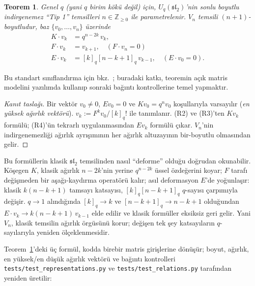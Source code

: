 \documentclass[10pt]{math}
\numberwithin{equation}{section}
\theoremstyle{plain}
\newtheorem{theorem}{Teorem}[section]
\theoremstyle{definition}
\renewcommand{\sl}{\mathfrak{sl}}
\newcommand{\Uq}{U_q(\sl_2)}
\newcommand{\Z}{\mathbb{Z}}
\newcommand{\qint}[1]{[#1]_q}
\newcommand{\qfact}[1]{[#1]_q!}
\begin{document}
\begin{theorem}\label{thm:irreps}
Genel $q$ (yani $q$ birim kökü değil) için, $\Uq$'nin sonlu boyutlu
indirgenemez ``Tip 1'' temsilleri $n \in \Z_{\geq 0}$ ile parametrelenir.
$V_n$ temsili $(n+1)$-boyutludur, baz $\{v_0, \dots, v_n\}$ üzerinde
\begin{align}
  K \cdot v_k &= q^{n - 2k}\, v_k, \\
  F \cdot v_k &= v_{k+1}, \quad (F \cdot v_n = 0) \\
  E \cdot v_k &= \qint{k} \qint{n - k + 1}\, v_{k-1}, \quad (E \cdot v_0 = 0).
\end{align}
\end{theorem}

Bu standart sınıflandırma için bkz.\ \cite{Kassel,ChariPressley,Lusztig};
buradaki katkı, teoremin açık matris modelini yazılımda kullanıp sonraki
bağıntı kontrollerine temel yapmaktır.

\begin{proof}[Kanıt taslağı]
Bir vektör $v_0 \neq 0$, $E v_0 = 0$ ve $K v_0 = q^n v_0$ koşullarıyla
varsayılır (\emph{en yüksek ağırlık vektörü}). $v_k := F^k v_0 / \qfact{k}$
ile tanımlanır. (R2) ve (R3)'ten $K v_k$ formülü; (R4)'ün tekrarlı
uygulanmasından $E v_k$ formülü çıkar. $V_n$'nin indirgenemezliği
ağırlık ayrışımının her ağırlık altuzayının bir-boyutlu olmasından
gelir.
\end{proof}

Bu formüllerin klasik $\sl_2$ temsilinden nasıl ``deforme'' olduğu doğrudan
okunabilir. Köşegen $K$, klasik ağırlık $n-2k$'nin yerine $q^{n-2k}$ üssel
özdeğerini koyar; $F$ tarafı değişmeden bir aşağı-kaydırma operatörü kalır;
asıl deformasyon $E$'de yoğunlaşır: klasik $k(n-k+1)$ tamsayı katsayısı,
$\qint{k}\qint{n-k+1}$ $q$-sayısı çarpımıyla değişir. $q\to 1$ alındığında
$\qint{k}\to k$ ve $\qint{n-k+1}\to n-k+1$ olduğundan $E\cdot v_k \to
k(n-k+1)\,v_{k-1}$ elde edilir ve klasik formüller eksiksiz geri gelir. Yani
$V_n$, klasik temsilin ağırlık örgüsünü korur; değişen tek şey katsayıların
$q$-sayılarıyla yeniden ölçeklenmesidir.

Teorem~\ref{thm:irreps}'deki üç formül, kodda birebir matris girişlerine
dönüşür; boyut, ağırlık, en yüksek/en düşük ağırlık vektörü ve bağıntı
kontrolleri \texttt{tests/test\_representations.py} ve
\texttt{tests/test\_relations.py} tarafından yeniden üretilir:
\end{document}
